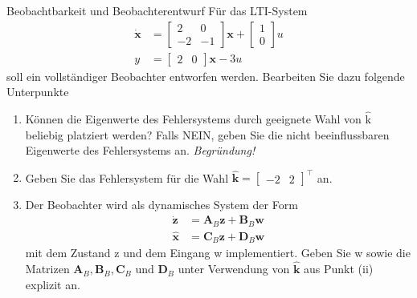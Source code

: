 \documentclass{article}
\begin{document}
\begin{task}{Beobachtbarkeit und Beobachterentwurf}
Für das LTI-System
\[\begin{aligned} \dot{\mathbf{x}} &=\left[\begin{array}{cc}{2} & {0} \\ {-2} & {-1}\end{array}\right] \mathbf{x}+\left[\begin{array}{c}{1} \\ {0}\end{array}\right] u \\ y &=\left[\begin{array}{cc}{2} & {0}\end{array}\right] \mathbf{x}-3 u \end{aligned}\]
soll ein vollständiger Beobachter entworfen werden. Bearbeiten Sie dazu folgende Unterpunkte
\begin{enumerate}[i]
    \item Können die Eigenwerte des Fehlersystems durch geeignete Wahl von $\hat{\mathrm{k}}$ beliebig
platziert werden? Falls NEIN, geben Sie die nicht beeinflussbaren Eigenwerte des
Fehlersystems an. \emph{Begründung!}
\item Geben Sie das Fehlersystem für die Wahl $\hat{\mathbf{k}}=\left[\begin{array}{cc}{-2} & {2}\end{array}\right]^{\top}$ an.
\item Der Beobachter wird als dynamisches System der Form
\[\begin{aligned} \dot{\mathbf{z}} &=\mathbf{A}_{B} \mathbf{z}+\mathbf{B}_{B} \mathbf{w} \\ \hat{\mathbf{x}} &=\mathbf{C}_{B} \mathbf{z}+\mathbf{D}_{B} \mathbf{w} \end{aligned}\]
mit dem Zustand z und dem Eingang w implementiert. Geben Sie w sowie die
Matrizen $\mathbf{A}_{B}, \mathbf{B}_{B}, \mathbf{C}_{B}$ und $\mathbf{D}_{B}$ unter Verwendung von $\hat{\mathbf{k}}$ aus Punkt (ii) explizit
an.

\end{enumerate}

\end{task}
\end{document}
